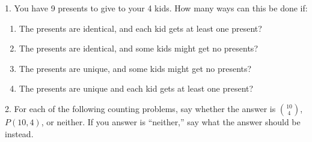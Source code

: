 \documentclass[10pt,]{book}
\theoremstyle{plain}
\theoremstyle{definition}
\theoremstyle{definition}
\theoremstyle{definition}
\numberwithin{equation}{section}
\begin{document}
\begin{exerciselist}
\item[1.]\hypertarget{exercise-102}{}
            You have 9 presents to give to your 4 kids. How many ways can this be done if:
\leavevmode%
\begin{enumerate}[label=(\alph*)]
\item\hypertarget{li-659}{}
                The presents are identical, and each kid gets at least one present?
\item\hypertarget{li-660}{}
                The presents are identical, and some kids might get no presents?
\item\hypertarget{li-661}{}
                The presents are unique, and some kids might get no presents?
\item\hypertarget{li-662}{}
                The presents are unique and each kid gets at least one present?
\end{enumerate}
\par\smallskip
\item[2.]\hypertarget{exercise-103}{}
            For each of the following counting problems, say whether the answer is \({10\choose 4}\), \(P(10,4)\), or neither.
            If you answer is ``neither,'' say what the answer should be instead.


\end{exerciselist}
\end{document}

